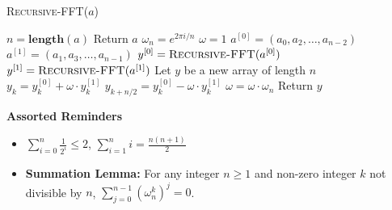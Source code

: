 \documentclass[11  pt]{exam}
\begin{document}
    \noindent\textsc{Recursive-FFT}($a$)
    \begin{algorithmic}
        \State $n = \textbf{length}(a)$
        \State Return $a$
        \EndIf
        \State $\omega_n = e^{2\pi i / n}$
        \State $\omega = 1$
        \State $a^{[0]} = (a_0, a_2, \hdots, a_{n-2})$
        \State $a^{[1]} = (a_1, a_3, \hdots, a_{n-1})$
        \State $y^{[0]} = \textsc{Recursive-FFT}(a^{[0]})$
        \State $y^{[1]} = \textsc{Recursive-FFT}(a^{[1]})$
        \State Let $y$ be a new array of length $n$
            \State $y_k = y^{[0]}_k + \omega \cdot y^{[1]}_k$
            \State $y_{k + n/2} = y^{[0]}_k - \omega \cdot y^{[1]}_k$
            \State $\omega = \omega \cdot \omega_n$
        \EndFor
        \State Return $y$
    \end{algorithmic}

    \noindent\textbf{Assorted Reminders}
    \begin{itemize}
        \item $\sum_{i = 0}^n \frac{1}{2^i} \leq 2$, \hspace{1in} $\sum_{i = 1}^n i = \frac{n(n+1)}{2}$
        \item \textbf{Summation Lemma:} For any integer $n \geq 1$ and non-zero integer $k$ not divisible by $n$, $\sum_{j=0}^{n-1} (\omega_n^k)^j = 0$.
    \end{itemize}

    
\end{document}

